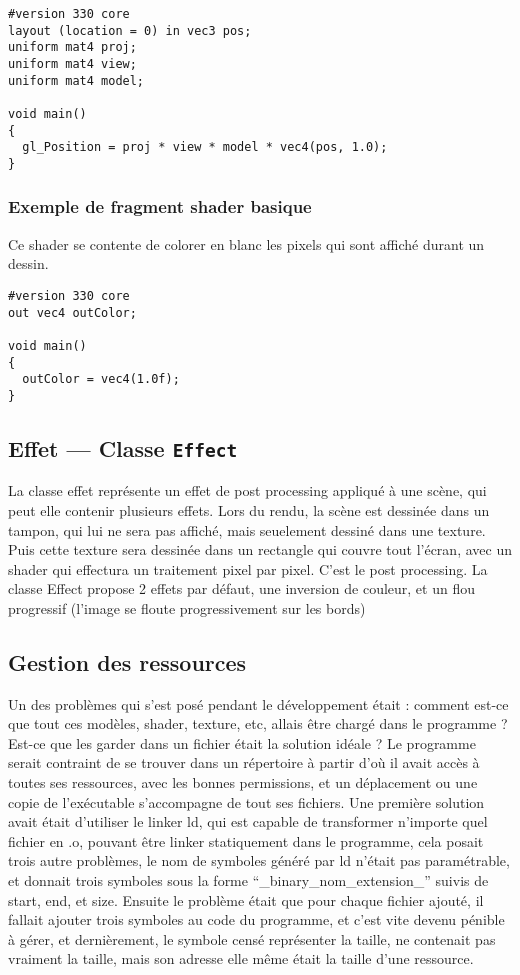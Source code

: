 \documentclass[pdftex, 11pt, a4paper, titlepage]{article}
\begin{document}
\begin{lstlisting}
#version 330 core
layout (location = 0) in vec3 pos;
uniform mat4 proj;
uniform mat4 view;
uniform mat4 model;

void main()
{
  gl_Position = proj * view * model * vec4(pos, 1.0);
}
\end{lstlisting}

\subsubsection{Exemple de fragment shader basique}
Ce shader se contente de colorer en blanc les pixels qui sont affiché
durant un dessin.

\begin{lstlisting}
#version 330 core
out vec4 outColor;

void main()
{
  outColor = vec4(1.0f);
}
\end{lstlisting}

\subsection{Effet --- Classe \texttt{Effect}}

La classe effet représente un effet de post processing appliqué à
une scène, qui peut elle contenir plusieurs effets.
Lors du rendu, la scène est dessinée dans un tampon, qui lui ne sera pas
affiché, mais seuelement dessiné dans une texture. Puis cette texture
sera dessinée dans un rectangle qui couvre tout l'écran, avec un shader
qui effectura un traitement pixel par pixel. C'est le post processing.
La classe Effect propose 2 effets par défaut, une inversion de couleur,
et un flou progressif (l'image se floute progressivement sur les bords)

\subsection{Gestion des ressources}

Un des problèmes qui s'est posé pendant le développement était :
comment est-ce que tout ces modèles, shader, texture, etc, allais être
chargé dans le programme ?  Est-ce que les garder dans un fichier
était la solution idéale ? Le programme serait contraint de se
trouver dans un répertoire à partir d'où il avait accès à toutes ses
ressources, avec les bonnes permissions, et un déplacement ou une
copie de l'exécutable s'accompagne de tout ses fichiers.  Une première
solution avait était d'utiliser le linker ld, qui est capable de
transformer n'importe quel fichier en .o, pouvant être linker
statiquement dans le programme, cela posait trois autre problèmes, le
nom de symboles généré par ld n'était pas paramétrable, et donnait
trois symboles sous la forme ``\_binary\_nom\_extension\_'' suivis de
start, end, et size. Ensuite le problème était que pour chaque fichier
ajouté, il fallait ajouter trois symboles au code du programme, et
c'est vite devenu pénible à gérer, et dernièrement, le symbole censé
représenter la taille, ne contenait pas vraiment la taille, mais son
adresse elle même était la taille d'une ressource.
\end{document}
